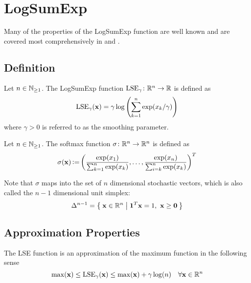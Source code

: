 \section{LogSumExp} \label{sec:theoretical_properties_of_LSE}

Many of the properties of the LogSumExp function are well known and
are covered most comprehensively in \cite{GaoPavel-PropertiesOfTheSoftmaxFunction} and \cite{BoydVandenberghe-ConvexOptimization}.


\subsection{Definition} \label{sec:LSE_definition}

\begin{definition} \label{def:LSE}
 Let \(n \in \mathbb{N}_{\geq 1}\). The LogSumExp function \(\operatorname{LSE}_\gamma \colon \mathbb{R}^n \to \mathbb{R}\) is defined as
 \[ \operatorname{LSE}_\gamma(\mathbf{x}) = \gamma \log \left({\sum_{k = 1}^n \exp(x_k/\gamma)}\right) \]
 where \(\gamma > 0\) is referred to as the smoothing parameter.
\end{definition}


\begin{definition} \label{def:softmax}
 Let \(n \in \mathbb{N}_{\geq 1}\). The softmax function \(\sigma \colon \mathbb{R}^n \to \mathbb{R}^n\) is defined as
 \[ \sigma(\mathbf{x}) \operatorname{\vcentcolon=} \left({ \frac{\exp(x_1)}{\sum_{k = 1}^n \exp(x_k)}, \ldots, \frac{\exp(x_n)}{\sum_{i = k}^n \exp(x_k)} }\right)^T\]
\end{definition}


\begin{remark}
 Note that \(\sigma\) maps into the set of \(n\) dimensional stochastic vectors, which is also called the \(n-1\) dimensional unit simplex:
 \[ \Delta^{n-1} = \Set{ \mathbf{x} \in \mathbb{R}^n | \mathbf{1}^T \mathbf{x} = 1, \ \mathbf{x} \geq \mathbf{0}} \]
\end{remark}



\subsection{Approximation Properties} \label{sec:LSE_approximation_properties}

\begin{theorem} \label{thm:LSE_approximates_max}
 The LSE function is an approximation of the maximum function in the following sense
 \[ \max (\mathbf{x}) \leq \operatorname{LSE}_\gamma (\mathbf{x}) \leq \max (\mathbf{x}) + \gamma \log(n) \quad \forall \mathbf{x} \in \mathbb{R}^n \]
\end{theorem}

